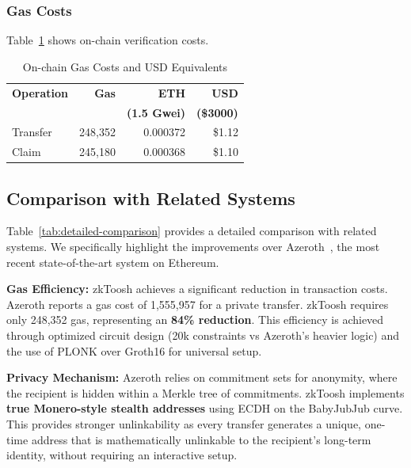 \documentclass[conference]{IEEEtran}
\begin{document}
\subsubsection{Gas Costs}

Table~\ref{tab:gas} shows on-chain verification costs.

\begin{table}[h]
\caption{On-chain Gas Costs and USD Equivalents}
\label{tab:gas}
\centering
\small
\begin{tabular}{lrrr}
\toprule
\textbf{Operation} & \textbf{Gas} & \textbf{ETH} & \textbf{USD} \\
 & & \textbf{(1.5 Gwei)} & \textbf{(\$3000)} \\
\midrule
Transfer & 248,352 & 0.000372 & \$1.12 \\
Claim & 245,180 & 0.000368 & \$1.10 \\
\bottomrule
\end{tabular}
\end{table}

\subsection{Comparison with Related Systems}

Table~\ref{tab:detailed-comparison} provides a detailed comparison with related systems. We specifically highlight the improvements over Azeroth~\cite{azeroth2023}, the most recent state-of-the-art system on Ethereum.

\textbf{Gas Efficiency:} zkToosh achieves a significant reduction in transaction costs. Azeroth reports a gas cost of 1,555,957 for a private transfer. zkToosh requires only 248,352 gas, representing an \textbf{84\% reduction}. This efficiency is achieved through optimized circuit design (20k constraints vs Azeroth's heavier logic) and the use of PLONK over Groth16 for universal setup.

\textbf{Privacy Mechanism:} Azeroth relies on commitment sets for anonymity, where the recipient is hidden within a Merkle tree of commitments. zkToosh implements \textbf{true Monero-style stealth addresses} using ECDH on the BabyJubJub curve. This provides stronger unlinkability as every transfer generates a unique, one-time address that is mathematically unlinkable to the recipient's long-term identity, without requiring an interactive setup.
\end{document}
